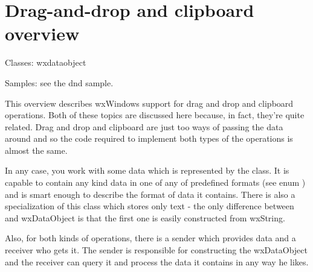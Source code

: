 \section{Drag-and-drop and clipboard overview}\label{wxdndoverview}

Classes: wxdataobject


Samples: see the dnd sample.

This overview describes wxWindows support for drag and drop and clipboard
operations. Both of these topics are discussed here because, in fact, they're
quite related. Drag and drop and clipboard are just too ways of passing the
data around and so the code required to implement both types of the operations
is almost the same.

In any case, you work with some data which is represented by the
 class. It is capable to contain any kind
data in one of any of predefined formats (see enum
) and is smart enough to describe the format
of data it contains. There is also a specialization of this class which stores
only text - the only difference between
 and wxDataObject is that the
first one is easily constructed from wxString.

Also, for both kinds of operations, there is a sender which provides data and
a receiver who gets it. The sender is responsible for constructing the
wxDataObject and the receiver can query it and process the data it contains
in any way he likes.

